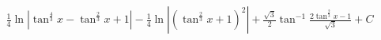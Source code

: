 \documentclass[preview]{standalone}
\begin{document}
\begin{align*}
\frac{1}{4}\ln|\tan^{\frac{4}{3}}x-\tan^{\frac{2}{3}}x+1|-\frac{1}{4}\ln|(\tan^{\frac{2}{3}}x+1)^2|+\frac{\sqrt3}{2}\tan^{-1}\frac{2\tan^{\frac{2}{3}}x-1}{\sqrt3}+C
\end{align*}
\end{document}
